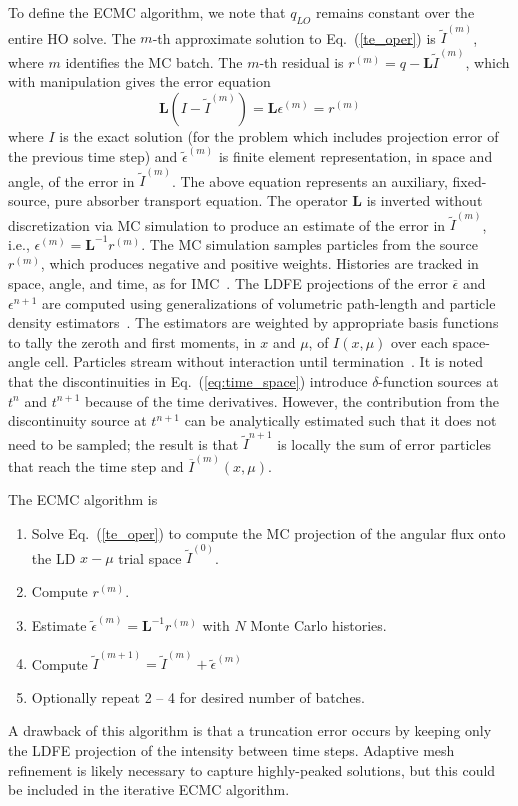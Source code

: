 \documentclass{anstrans}
\renewcommand{\eqref}[1]{(\ref{#1})}
\newcommand{\B}[1]{\ensuremath{\mathbf{#1}}}
\begin{document}
To define the ECMC algorithm, we note that $q_{LO}$ remains constant over the entire HO solve.
The $m$-th approximate solution to Eq.~\eqref{te_oper} is $\tilde{I}^{(m)}$, where
$m$ identifies the MC batch.
The $m$-th residual is $r^{(m)} = q - \B L\tilde{I}^{(m)}$, which with manipulation gives the error equation
\begin{equation}
\B L (I - \tilde{I}^{(m)}) = \B L {\epsilon}^{(m)} = r^{(m)}
\end{equation}
where $I$ is the exact solution (for the problem which includes projection error of the
previous time step) and $\tilde{\epsilon}^{(m)}$ is finite element
representation, in space and angle, of the error in
$\tilde{I}^{(m)}$. The above equation represents an auxiliary, fixed-source, pure
absorber transport equation.
The operator $\B L$ is inverted without discretization via MC simulation to produce an
estimate of the error in $\tilde{I}^{(m)}$, i.e., ${\epsilon}^{(m)} = \B
L^{-1} r^{(m)}$.  The MC simulation samples particles from the source $r^{(m)}$, which
produces negative and positive weights.  Histories are tracked in space, angle, and time, as for IMC~\cite{wollaber_review}.
The LDFE projections of the error $\overline{\epsilon}$ and $\epsilon^{n+1}$ are computed using
generalizations of volumetric path-length and particle density
estimators~\cite{wollaber_review}.  The estimators are weighted by appropriate basis
functions to tally the zeroth and first moments, in $x$ and $\mu$, of $I(x,\mu)$ over each
space-angle cell.  Particles stream without interaction until termination~\cite{nse_bolding}.
It is noted that the discontinuities in Eq.~\eqref{eq:time_space} introduce $\delta$-function sources at $t^{n}$ and $t^{n+1}$
because of the time derivatives.
However, the contribution from the discontinuity source at $t^{n+1}$ can be analytically
estimated such that it does not need to be sampled; the result is that $\tilde I^{n+1}$ is locally the sum of
error particles that reach the time step and $\overline I^{(m)}(x,\mu)$.  

  The ECMC algorithm is
\begin{enumerate}
\item Solve Eq.~\eqref{te_oper} to compute the MC projection of the angular
flux onto the LD $x-\mu$ trial space $\tilde I^{(0)}$.
\item Compute $r^{(m)}$.
\item Estimate $\tilde{\epsilon}^{(m)} = \B L^{-1} r^{(m)}$ with $N$ Monte Carlo histories.
\item Compute $\tilde I^{(m+1)} = \tilde I^{(m)}
+ \tilde\epsilon^{(m)}$
\item Optionally repeat 2 -- 4 for desired number of batches.
\end{enumerate}
A drawback of this algorithm is that
a truncation error occurs by keeping only the LDFE projection of the intensity between
time steps.  Adaptive mesh refinement is likely necessary to capture highly-peaked solutions, but
this could be included in the iterative ECMC algorithm.
\end{document}
